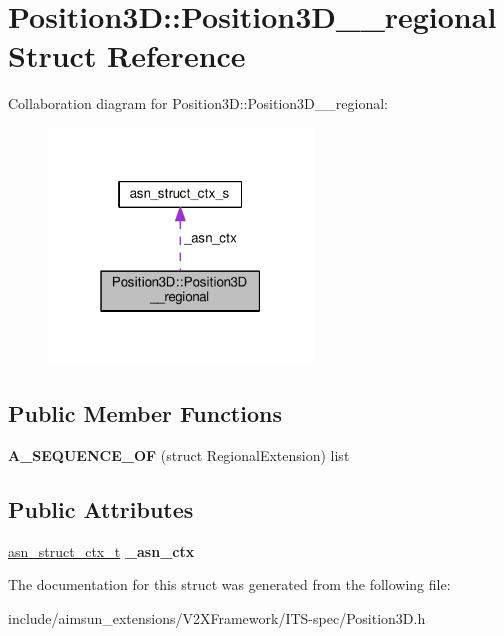 \hypertarget{structPosition3D_1_1Position3D____regional}{}\section{Position3D\+:\+:Position3\+D\+\_\+\+\_\+regional Struct Reference}
\label{structPosition3D_1_1Position3D____regional}


Collaboration diagram for Position3D\+:\+:Position3\+D\+\_\+\+\_\+regional\+:\nopagebreak
\begin{figure}[H]
\begin{center}
\leavevmode
\includegraphics[width=199pt]{structPosition3D_1_1Position3D____regional__coll__graph}
\end{center}
\end{figure}
\subsection*{Public Member Functions}
\begin{DoxyCompactItemize}
\item 
{\bfseries A\+\_\+\+S\+E\+Q\+U\+E\+N\+C\+E\+\_\+\+OF} (struct Regional\+Extension) list\hypertarget{structPosition3D_1_1Position3D____regional_a1172d9e0a4f41f7faeb19b6948d17198}{}\label{structPosition3D_1_1Position3D____regional_a1172d9e0a4f41f7faeb19b6948d17198}

\end{DoxyCompactItemize}
\subsection*{Public Attributes}
\begin{DoxyCompactItemize}
\item 
\hyperlink{structasn__struct__ctx__s}{asn\+\_\+struct\+\_\+ctx\+\_\+t} {\bfseries \+\_\+asn\+\_\+ctx}\hypertarget{structPosition3D_1_1Position3D____regional_a5a140ab101b590ce486d0cc3a3818a8c}{}\label{structPosition3D_1_1Position3D____regional_a5a140ab101b590ce486d0cc3a3818a8c}

\end{DoxyCompactItemize}


The documentation for this struct was generated from the following file\+:\begin{DoxyCompactItemize}
\item 
include/aimsun\+\_\+extensions/\+V2\+X\+Framework/\+I\+T\+S-\/spec/Position3\+D.\+h\end{DoxyCompactItemize}
